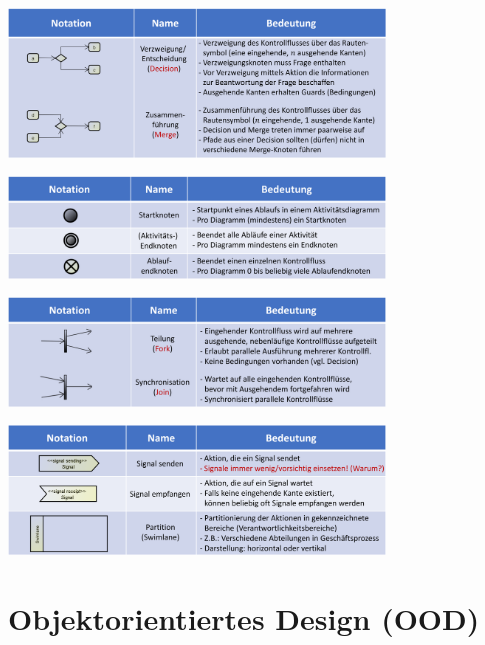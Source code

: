 \documentclass[11pt, a4paper]{article}
\begin{document}
\vspace{1em}

\centering
\includegraphics[width=0.75\textwidth]{Aktivitaet-Tabellen/2.png}

\vspace{1em}

\centering
\includegraphics[width=0.75\textwidth]{Aktivitaet-Tabellen/3.png}

\vspace{1em}

\centering
\includegraphics[width=0.75\textwidth]{Aktivitaet-Tabellen/4.png}

\vspace{1em}

\centering
\includegraphics[width=0.75\textwidth]{Aktivitaet-Tabellen/5.png}




\section{Objektorientiertes Design (OOD)} %
\end{document}

